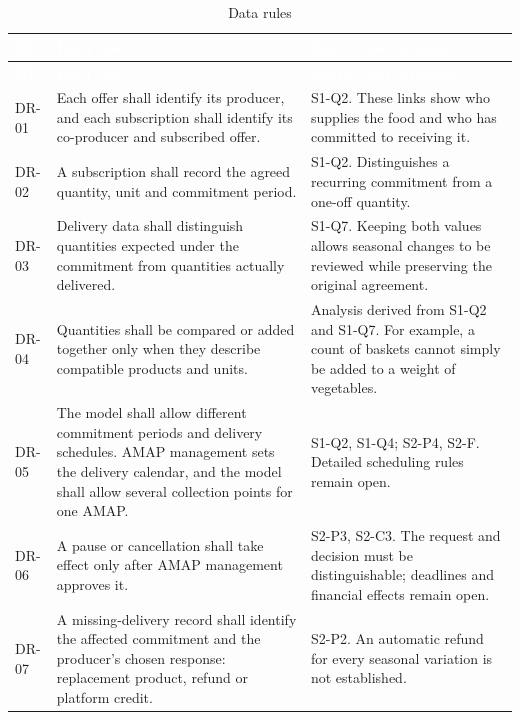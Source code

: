 \documentclass[11pt,a4paper]{article}
\begin{document}
{\footnotesize
\begin{longtable}{>{\raggedright\arraybackslash\hspace{0pt}}p{}>{\raggedright\arraybackslash\hspace{0pt}}p{}>{\raggedright\arraybackslash\hspace{0pt}}p{}}
\caption{Data rules}\\
\rowcolor{hdr}\textcolor{white}{\textbf{ID}} & \textcolor{white}{\textbf{Data rule}} & \textcolor{white}{\textbf{Source and rationale}} \\ \endfirsthead
\rowcolor{hdr}\textcolor{white}{\textbf{ID}} & \textcolor{white}{\textbf{Data rule}} & \textcolor{white}{\textbf{Source and rationale}} \\ \endhead
DR-01 & Each offer shall identify its producer, and each subscription shall identify its co-producer and subscribed offer. & S1-Q2. These links show who supplies the food and who has committed to receiving it. \\ \hline
DR-02 & A subscription shall record the agreed quantity, unit and commitment period. & S1-Q2. Distinguishes a recurring commitment from a one-off quantity. \\ \hline
DR-03 & Delivery data shall distinguish quantities expected under the commitment from quantities actually delivered. & S1-Q7. Keeping both values allows seasonal changes to be reviewed while preserving the original agreement. \\ \hline
DR-04 & Quantities shall be compared or added together only when they describe compatible products and units. & Analysis derived from S1-Q2 and S1-Q7. For example, a count of baskets cannot simply be added to a weight of vegetables. \\ \hline
DR-05 & The model shall allow different commitment periods and delivery schedules. AMAP management sets the delivery calendar, and the model shall allow several collection points for one AMAP. & S1-Q2, S1-Q4; S2-P4, S2-F. Detailed scheduling rules remain open. \\ \hline
DR-06 & A pause or cancellation shall take effect only after AMAP management approves it. & S2-P3, S2-C3. The request and decision must be distinguishable; deadlines and financial effects remain open. \\ \hline
DR-07 & A missing-delivery record shall identify the affected commitment and the producer's chosen response: replacement product, refund or platform credit. & S2-P2. An automatic refund for every seasonal variation is not established. \\ \hline

\end{longtable}}
\end{document}
